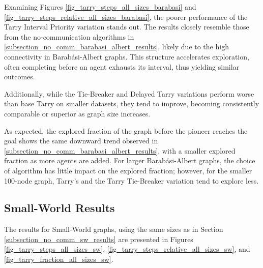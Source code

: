 Examining Figures \ref{fig_tarry_steps_all_sizes_barabasi} and \ref{fig_tarry_steps_relative_all_sizes_barabasi}, the poorer performance of the Tarry Interval Priority variation stands out. The results closely resemble those from the no-communication algorithms in \ref{subsection_no_comm_barabasi_albert_results}, likely due to the high connectivity in Barabási-Albert graphs. This structure accelerates exploration, often completing before an agent exhausts its interval, thus yielding similar outcomes.

Additionally, while the Tie-Breaker and Delayed Tarry variations perform worse than base Tarry on smaller datasets, they tend to improve, becoming consistently comparable or superior as graph size increases.

As expected, the explored fraction of the graph before the pioneer reaches the goal shows the same downward trend observed in \ref{subsection_no_comm_barabasi_albert_results}, with a smaller explored fraction as more agents are added. For larger Barabási-Albert graphs, the choice of algorithm has little impact on the explored fraction; however, for the smaller 100-node graph, Tarry's and the Tarry Tie-Breaker variation tend to explore less.
    
\subsection{Small-World Results} 
\label{subsection_tarry_sw_results}

The results for Small-World graphs, using the same sizes as in Section \ref{subsection_no_comm_sw_results} are presented in Figures \ref{fig_tarry_steps_all_sizes_sw}, \ref{fig_tarry_steps_relative_all_sizes_sw}, and \ref{fig_tarry_fraction_all_sizes_sw}.

